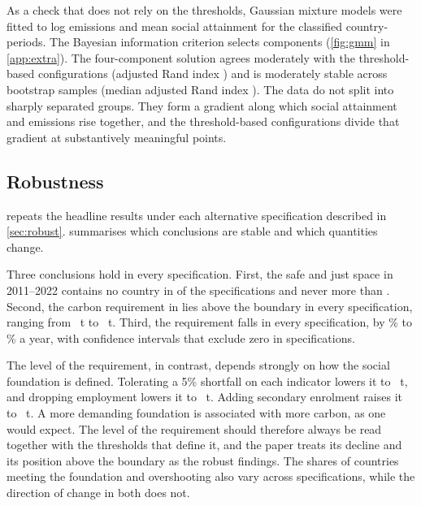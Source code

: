 As a check that does not rely on the thresholds, Gaussian mixture models were fitted to log emissions and mean social attainment for the \nGmmN{} classified country-periods. The Bayesian information criterion selects \nGmmK{} components (\cref{fig:gmm} in \cref{app:extra}). The four-component solution agrees moderately with the threshold-based configurations (adjusted Rand index \nGmmAri) and is moderately stable across bootstrap samples (median adjusted Rand index \nGmmStab). The data do not split into sharply separated groups. They form a gradient along which social attainment and emissions rise together, and the threshold-based configurations divide that gradient at substantively meaningful points.

\subsection{Robustness}\label{sec:res-robust}

 repeats the headline results under each alternative specification described in \cref{sec:robust}.  summarises which conclusions are stable and which quantities change.





Three conclusions hold in every specification. First, the safe and just space in 2011--2022 contains no country in \nRobSafeZeroSpecs{} of the \nRobSpecs{} specifications and never more than \nRobSafeMax. Second, the carbon requirement in \nLastYear{} lies above the boundary in every specification, ranging from \nRobReqMin~t to \nRobReqMax~t. Third, the requirement falls in every specification, by \nRobTrendMin\% to \nRobTrendMax\% a year, with confidence intervals that exclude zero in \nRobTrendAllNeg{} specifications.

The level of the requirement, in contrast, depends strongly on how the social foundation is defined. Tolerating a 5\% shortfall on each indicator lowers it to \nRobReqTol~t, and dropping employment lowers it to \nRobReqNoEmp~t. Adding secondary enrolment raises it to \nRobReqEdu~t. A more demanding foundation is associated with more carbon, as one would expect. The level of the requirement should therefore always be read together with the thresholds that define it, and the paper treats its decline and its position above the boundary as the robust findings. The shares of countries meeting the foundation and overshooting also vary across specifications, while the direction of change in both does not.

